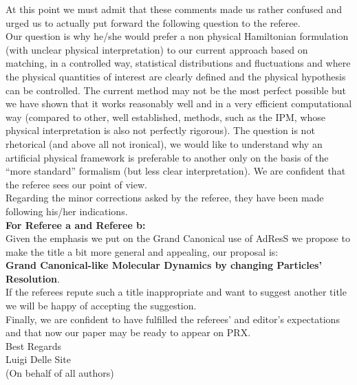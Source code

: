 \documentclass[12pt,a4paper]{article}
\begin{document}
At this point we must admit that these comments made us rather confused and urged us to actually put forward the following question to the referee.\\
Our question is why he/she would prefer a non physical Hamiltonian formulation (with unclear physical interpretation) to our current approach based on matching, in a controlled way, statistical distributions and fluctuations and where the physical quantities of interest are clearly defined and the physical hypothesis can be controlled. The current method may not be the most perfect possible but we have shown that it works reasonably well and in a very efficient computational way (compared to other, well established, methods, such as the {IPM}, whose physical interpretation is also not perfectly rigorous). The question is not rhetorical (and above all not ironical), we would like to understand why an artificial physical framework is preferable to another only on the basis of the ``more standard'' formalism (but less clear interpretation). We are confident that the referee sees our point of view.\\


Regarding the minor corrections asked by the referee, they have been made following his/her indications.\\



{\bf For Referee a and Referee b:}\\
Given the emphasis we put on the Grand Canonical use of AdResS we propose to make the title a bit more general and appealing, our proposal is:\\
{\bf Grand Canonical-like Molecular Dynamics by changing Particles' Resolution}.\\
If the referees repute such a title inappropriate and want to suggest another title we will be happy of accepting the suggestion.\\


Finally, we are confident to have fulfilled the referees' and editor's expectations and that now our paper may be ready to appear on PRX.\\


Best Regards\\



Luigi Delle Site\\
(On behalf of all authors)\\
\end{document}
